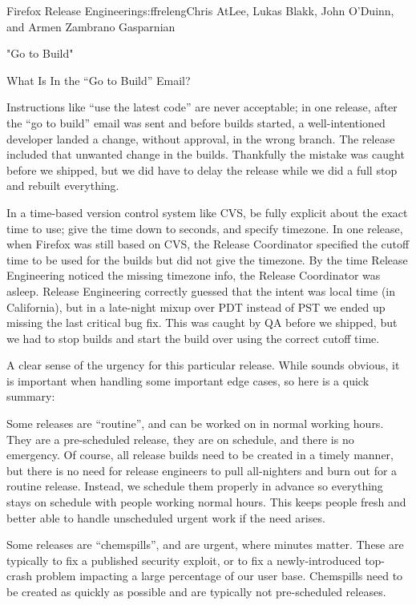 \begin{aosachapter}{Firefox Release Engineering}{s:ffreleng}{Chris AtLee, Lukas Blakk, John O'Duinn, and Armen Zambrano Gasparnian}
\begin{aosasect1}{"Go to Build"}
\begin{aosasect2}{What Is In the ``Go to Build'' Email?}
\begin{aosaenumerate}
\begin{aosaenumerate2}
    \item Instructions like ``use the latest code'' are never acceptable; in one
      release, after the ``go to build'' email was sent and before
      builds started, a well-intentioned developer landed a change,
      without approval, in the wrong branch. The release included that
      unwanted change in the builds. Thankfully the mistake was
      caught before we shipped, but we did have to delay the release 
      while we did a full stop and rebuilt everything.

    \item In a time-based version control system like CVS, be fully
      explicit about the exact time to use; give the time down to seconds,
      and specify timezone. In one release, when Firefox was still
      based on CVS, the Release Coordinator specified the cutoff time
      to be used for the builds but did not give the timezone. By the
      time Release Engineering noticed the missing timezone info, the
      Release Coordinator was asleep. Release
      Engineering correctly guessed that the intent was local time (in
      California), but in a late-night mixup over PDT instead of PST
      we ended up missing the last critical bug fix. This was caught
      by QA before we shipped, but we had to stop builds and
      start the build over using the correct cutoff time.

    \end{aosaenumerate2}

\item A clear sense of the urgency for this particular release.  While
  sounds obvious, it is important when handling some important edge
  cases, so here is a quick summary:

  \begin{aosaenumerate2}

    \item Some releases are ``routine'', and can be worked on in
      normal working hours. They are a pre-scheduled release, they are
      on schedule, and there is no emergency. Of course, all release
      builds need to be created in a timely manner, but there is no
      need for release engineers to pull all-nighters and burn out
      for a routine release.  Instead, we schedule them
      properly in advance so everything stays on schedule with people
      working normal hours. This keeps people fresh and better able to
      handle unscheduled urgent work if the need arises.

    \item Some releases are ``chemspills'', and are urgent, where minutes matter. These are
      typically to fix a published security exploit, or to fix a
      newly-introduced top-crash problem impacting a large percentage
      of our user base. Chemspills need to be created as
      quickly as possible and are typically not pre-scheduled
      releases.


\end{aosaenumerate2}
\end{aosaenumerate}
\end{aosasect2}
\end{aosasect1}
\end{aosachapter}
